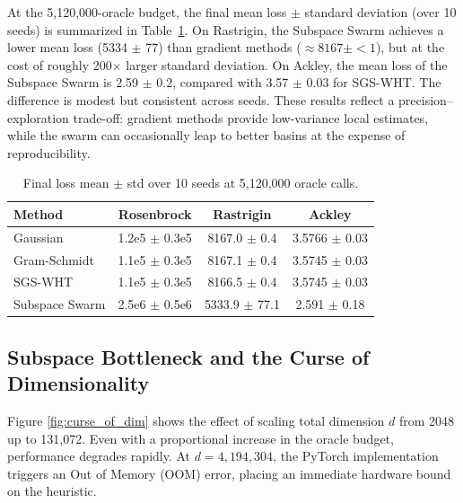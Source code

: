 \documentclass[11pt,a4paper]{article}
\begin{document}
At the 5,120,000-oracle budget, the final mean loss $\pm$ standard deviation (over 10 seeds) is summarized in Table~\ref{tab:final_loss}. On Rastrigin, the Subspace Swarm achieves a lower mean loss (5334 $\pm$ 77) than gradient methods ($\approx 8167 \pm <1$), but at the cost of roughly 200$\times$ larger standard deviation. On Ackley, the mean loss of the Subspace Swarm is 2.59 $\pm$ 0.2, compared with 3.57 $\pm$ 0.03 for SGS-WHT. The difference is modest but consistent across seeds. These results reflect a precision–exploration trade-off: gradient methods provide low-variance local estimates, while the swarm can occasionally leap to better basins at the expense of reproducibility.

\begin{table}[h]
\centering
\caption{Final loss mean $\pm$ std over 10 seeds at 5,120,000 oracle calls.}
\label{tab:final_loss}
\begin{tabular}{lccc}
\toprule
\textbf{Method} & \textbf{Rosenbrock} & \textbf{Rastrigin} & \textbf{Ackley} \\
\midrule
Gaussian        & 1.2e5 $\pm$ 0.3e5 & 8167.0 $\pm$ 0.4 & 3.5766 $\pm$ 0.03 \\
Gram-Schmidt    & 1.1e5 $\pm$ 0.3e5 & 8167.1 $\pm$ 0.4 & 3.5745 $\pm$ 0.03 \\
SGS-WHT         & 1.1e5 $\pm$ 0.3e5 & 8166.5 $\pm$ 0.4 & 3.5745 $\pm$ 0.03 \\
Subspace Swarm  & 2.5e6 $\pm$ 0.5e6 & 5333.9 $\pm$ 77.1 & 2.591 $\pm$ 0.18 \\
\bottomrule
\end{tabular}
\end{table}

\subsection{Subspace Bottleneck and the Curse of Dimensionality}

Figure \ref{fig:curse_of_dim} shows the effect of scaling total dimension $d$ from 2048 up to 131,072. Even with a proportional increase in the oracle budget, performance degrades rapidly. At $d = 4,\!194,\!304$, the PyTorch implementation triggers an Out of Memory (OOM) error, placing an immediate hardware bound on the heuristic.
\end{document}

